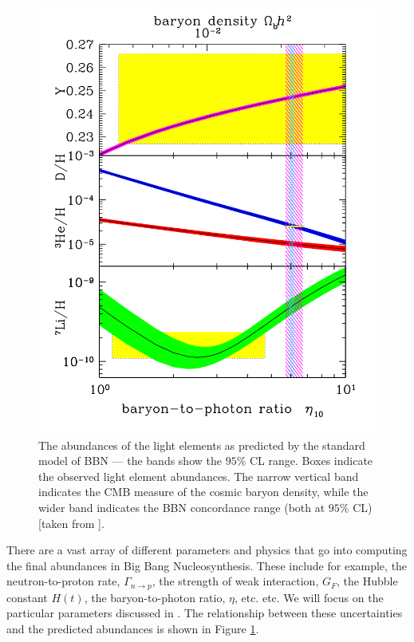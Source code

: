 \documentclass[11pt]{article}
\numberwithin{equation}{section}
\numberwithin{figure}{section}
\numberwithin{table}{section}
\begin{document}
\begin{figure}[t]
\begin{center}
\includegraphics[width=0.6\linewidth]{abundances}
\caption{The abundances of the light elements as predicted by the standard model of BBN — the bands show the $95\%$ CL range. Boxes indicate the observed light element abundances. The narrow vertical band indicates the CMB measure of the cosmic baryon density, while the wider band indicates the BBN concordance range (both at $95\%$ CL) [taken from \citet{Fields:2014uja}].}\label{fig:abun}
\end{center}
\end{figure}


There are a vast array of different parameters and physics that go into computing the final abundances in Big Bang Nucleosynthesis. These include for example, the neutron-to-proton rate, $\Gamma_{n \rightarrow p}$, the strength of weak interaction, $G_F$, the Hubble constant $H(t)$, the baryon-to-photon ratio, $\eta$, etc. etc. We will focus on the particular parameters discussed in \citet{Fields:2014uja}. The relationship between these uncertainties and the predicted abundances is shown in Figure \ref{fig:abun}.
\end{document}
